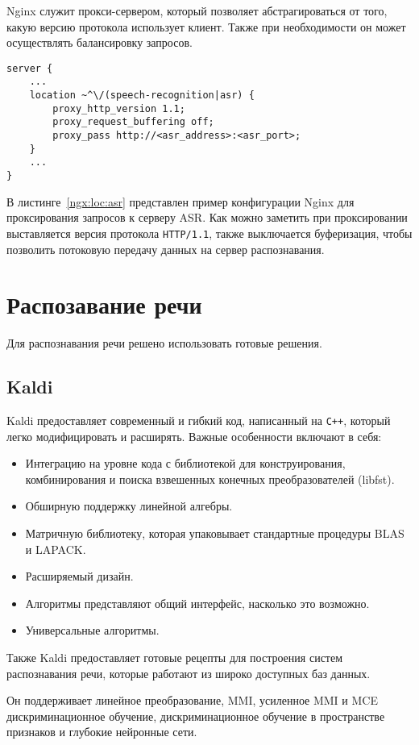Nginx служит прокси-сервером, который позволяет абстрагироваться от того, какую
версию протокола использует клиент. Также при необходимости он может осуществлять
балансировку запросов.
\begin{lstlisting}[caption={Пример конфигурации Nginx}, label={ngx:loc:asr}]
server {
    ...
    location ~^\/(speech-recognition|asr) {
        proxy_http_version 1.1;
        proxy_request_buffering off;
        proxy_pass http://<asr_address>:<asr_port>;
    }
    ...
}
\end{lstlisting}

В листинге~\ref{ngx:loc:asr} представлен пример конфигурации Nginx для проксирования
запросов к серверу ASR. Как можно заметить при проксировании выставляется
версия протокола \texttt{HTTP/1.1}, также выключается буферизация, чтобы позволить
потоковую передачу данных на сервер распознавания.


\section{Распозавание речи}
Для распознавания речи решено использовать готовые решения.
\subsection{Kaldi}
Kaldi предоставляет современный и гибкий код, написанный на \texttt{C++}, который
легко модифицировать и расширять. Важные особенности включают в себя:

\begin{itemize}
    \item Интеграцию на уровне кода с библиотекой для конструирования, комбинирования
        и поиска взвешенных конечных преобразователей (libfst).
    \item Обширную поддержку линейной алгебры.
    \item Матричную библиотеку, которая упаковывает стандартные процедуры BLAS и LAPACK.
    \item Расширяемый дизайн.
    \item Алгоритмы представляют общий интерфейс, насколько это возможно.
    \item Универсальные алгоритмы.
\end{itemize}

Также Kaldi предоставляет готовые рецепты для построения систем \\ \mbox{распознавания} речи,
которые работают из широко доступных баз данных.

Он поддерживает линейное преобразование, MMI,
усиленное MMI и MCE дискриминационное обучение, дискриминационное обучение в
пространстве признаков и глубокие нейронные сети.

